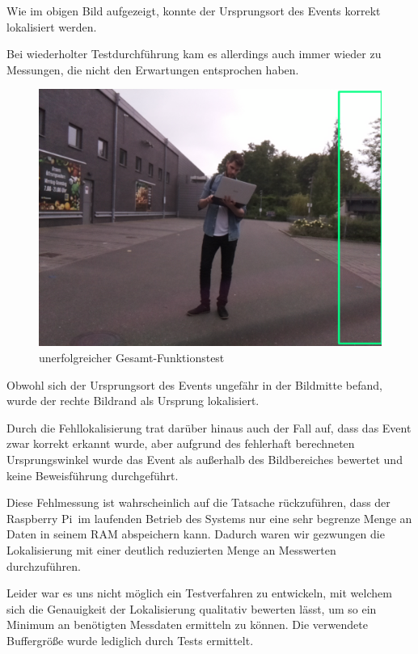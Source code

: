 Wie im obigen Bild aufgezeigt, konnte der Ursprungsort des Events korrekt lokalisiert werden. 

Bei wiederholter Testdurchführung kam es allerdings auch immer wieder zu Messungen, die nicht den Erwartungen entsprochen haben.

\begin{figure}[h]
	\begin{center}
		\includegraphics[scale=0.1]{Sections/Tests/Test_8}
	\end{center}
	\caption{unerfolgreicher Gesamt-Funktionstest}
	\label{fig:Test_8}
\end{figure}

Obwohl sich der Ursprungsort des Events ungefähr in der Bildmitte befand, wurde der rechte Bildrand als Ursprung lokalisiert. 

Durch die Fehllokalisierung trat darüber hinaus auch der Fall auf, dass das Event zwar korrekt erkannt wurde, aber aufgrund des fehlerhaft berechneten Ursprungswinkel wurde das Event als außerhalb des Bildbereiches bewertet und keine Beweisführung durchgeführt. 

Diese Fehlmessung ist wahrscheinlich auf die Tatsache rückzuführen, dass der \glqq Raspberry Pi\grqq\ im laufenden Betrieb des Systems nur eine sehr begrenze Menge an Daten in seinem RAM abspeichern kann. Dadurch waren wir gezwungen die Lokalisierung mit einer deutlich reduzierten Menge an Messwerten durchzuführen. 

Leider war es uns nicht möglich ein Testverfahren zu entwickeln, mit welchem sich die Genauigkeit der Lokalisierung qualitativ bewerten lässt, um so ein Minimum an benötigten Messdaten ermitteln zu können. Die verwendete Buffergröße wurde lediglich durch Tests ermittelt.

